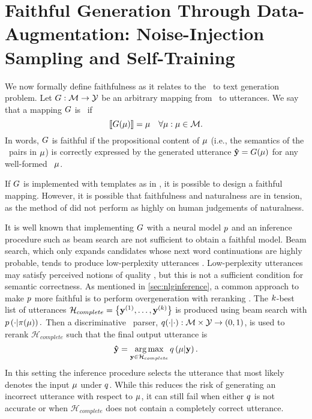 \section{Faithful Generation Through Data-Augmentation: Noise-Injection Sampling and Self-Training}
\label{sec:nlgfg}

We now formally define faithfulness as it relates to the
\meaningrepresentation~to text generation problem.  Let $G : \mathcal{M}
\rightarrow \mathcal{Y}$ be an arbitrary mapping from \meaningrepresentations~to
utterances. We say that a mapping $G$ is \faithful~if \[\left\llbracket G(\mu) \right\rrbracket
= \mu \quad \forall \mu: \mu \in \mathcal{M}.\] In words, $G$ is faithful if
the propositional content of $\mu$ (i.e., the semantics of the
\attributevalue~pairs in $\mu$) is correctly expressed by the generated
utterance $\boldsymbol{\hat{\mathbf{y}}} = G(\mu)$ for any well-formed
\meaningrepresentation~$\mu$. 

If $G$ is implemented with templates as in \cite{puzikov2018}, it is
possible to design a faithful mapping. However, it is possible that
faithfulness and naturalness are in tension, as the method of
\cite{puzikov2018} did not perform as highly on human judgements of
naturalness.

It is well known that implementing $G$ with a neural model $p$ and an
inference procedure such as beam search are not sufficient to obtain a faithful
model.  Beam search, which only expands candidates whose next word
continuations are highly probable, tends to produce low-perplexity utterances
\citep{serban2016}. Low-perplexity utterances may satisfy perceived notions of
quality \citep{meister2020}, but this is not a sufficient condition for
semantic correctness.  As mentioned in \autoref{sec:nlginference},  a common
approach to make $p$ more faithful is to perform overgeneration with
reranking \citep{dusek2016,juraska2018,dusek2019,dusek2020}.  The $k$-best
list of utterances $\mathcal{H}_{complete} = \left\{\mathbf{y}^{(1)},\ldots,
\mathbf{y}^{(k)}\right\}$ is produced using beam search with
$p\left(\cdot|\pi(\mu)\right).$ Then a discriminative
\meaningrepresentation~parser, $q(\cdot|\cdot) : \mathcal{M} \times
\mathcal{Y} \rightarrow (0,1)$, is used to rerank $\mathcal{H}_{complete}$ such
that the final output utterance is \[ \boldsymbol{\hat{\mathbf{y}}} = \operatorname*{arg\,max}_{\mathbf{y} \in
\mathcal{H}_{complete}} q\left(\mu\vert\mathbf{y}\right). \] In this
setting the inference procedure selects the utterance that most likely denotes
the input $\mu$ under $q$. While this reduces the risk of generating an
incorrect utterance with respect to $\mu$, it can still fail when either
$q$ is not accurate or when $\mathcal{H}_{complete}$ does not contain a
completely correct utterance.

